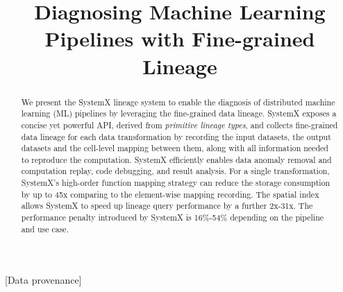 \documentclass{sig-alternate}
\begin{document}
\title{Diagnosing Machine Learning Pipelines with Fine-grained Lineage}


\maketitle

\begin{abstract}
We present the SystemX lineage system to enable the diagnosis of distributed machine learning (ML) pipelines by leveraging the fine-grained
data lineage.  
SystemX exposes a concise yet powerful API, derived from \emph{primitive lineage types}, and collects fine-grained data lineage for each 
data transformation by recording the input datasets, the output datasets and the cell-level mapping between them, along
with all information needed to reproduce the computation.
SystemX efficiently enables data anomaly removal and computation replay, code debugging, and result analysis.
For a single transformation, SystemX's high-order function mapping strategy can reduce the storage consumption by up to 
45x comparing to the element-wise mapping recording.
The spatial index allows SystemX to speed up lineage query performance by a further 2x-31x. 
The performance penalty introduced by SystemX is 16\%-54\% depending on the pipeline and use case.
\end{abstract}

[Data provenance]
\end{document}
